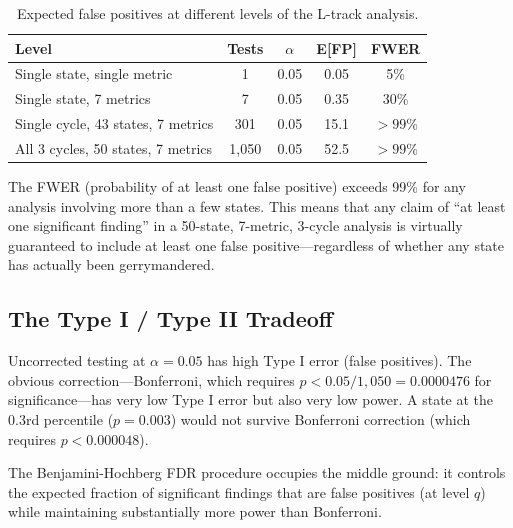 \begin{table}[h]
\centering
\caption{Expected false positives at different levels of the L-track analysis.}
\label{tab:fp-scale}
\begin{tabular}{lcccc}
\toprule
Level & Tests & $\alpha$ & E[FP] & FWER \\
\midrule
Single state, single metric & 1 & 0.05 & 0.05 & 5\% \\
Single state, 7 metrics & 7 & 0.05 & 0.35 & 30\% \\
Single cycle, 43 states, 7 metrics & 301 & 0.05 & 15.1 & $>99\%$ \\
All 3 cycles, 50 states, 7 metrics & 1,050 & 0.05 & 52.5 & $>99\%$ \\
\bottomrule
\end{tabular}
\end{table}

The FWER (probability of at least one false positive) exceeds 99\% for
any analysis involving more than a few states.
This means that any claim of ``at least one significant finding'' in a
50-state, 7-metric, 3-cycle analysis is virtually guaranteed to include
at least one false positive---regardless of whether any state has
actually been gerrymandered.

\subsection{The Type I / Type II Tradeoff}

Uncorrected testing at $\alpha = 0.05$ has high Type I error (false positives).
The obvious correction---Bonferroni, which requires $p < 0.05/1{,}050 = 0.0000476$
for significance---has very low Type I error but also very low power.
A state at the 0.3rd percentile ($p = 0.003$) would not survive
Bonferroni correction (which requires $p < 0.000048$).

The Benjamini-Hochberg FDR procedure occupies the middle ground:
it controls the expected fraction of significant findings that are false
positives (at level $q$) while maintaining substantially more power
than Bonferroni.
